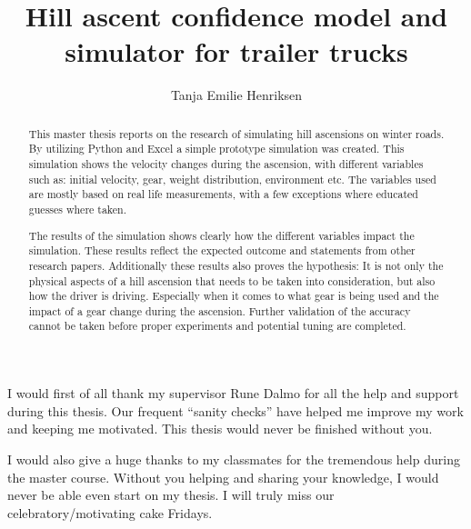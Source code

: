 \documentclass[noprint]{uit-thesis}
\begin{document}
\title{Hill ascent confidence model and simulator for trailer trucks}
\subtitle{ }%
\author{Tanja Emilie Henriksen}

\maketitle

\frontmatter

\begin{abstract}
This master thesis reports on the research of simulating hill ascensions on winter roads. By utilizing Python and Excel a simple prototype simulation was created. This simulation shows the velocity changes during the ascension, with different variables such as: initial velocity, gear, weight distribution, environment etc. The variables used are mostly based on real life measurements, with a few exceptions where educated guesses where taken. 
\par
The results of the simulation shows clearly how the different variables impact the simulation. These results reflect the expected outcome and statements from other research papers. Additionally these results also proves the hypothesis: It is not only the physical aspects of a hill ascension that needs to be taken into consideration, but also how the driver is driving. Especially when it comes to what gear is being used and the impact of a gear change during the ascension. Further validation of the accuracy cannot be taken before proper experiments and potential tuning are completed.

\end{abstract}

\begin{acknowledgement}
I would first of all thank my supervisor Rune Dalmo for all the help and support during this thesis. Our frequent “sanity checks” have helped me improve my work and keeping me motivated. This thesis would never be finished without you. 
\par
I would also give a huge thanks to my classmates for the tremendous help during the master course. Without you helping and sharing your knowledge, I would never be able even start on my thesis. I will truly miss our celebratory/motivating cake Fridays. 
\end{acknowledgement}
\end{document}

